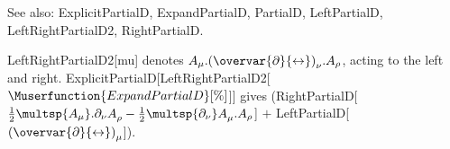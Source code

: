 See also: ExplicitPartialD, ExpandPartialD, PartialD, LeftPartialD, LeftRightPartialD2, RightPartialD.


\dispSFinmath{
\mu
}

\dispSFoutmath{
\mu
}

\dispSFinmath{
\mu
}


\dispSFinmath{
{{\left( \overvar{\partial }{\leftrightarrow } \right) }_{\mu }}
}










LeftRightPartialD2[mu] denotes \({A_{\mu }}.{{\left( \overvar{\partial }{\leftrightarrow } \right) }_{\nu }}.{A_{\rho }}\), acting to the left and
right. ExplicitPartialD[LeftRightPartialD2[\(\Muserfunction{ExpandPartialD}[\%]\)]] gives (RightPartialD[\(\frac{1}{2}\multsp {A_{\mu }}.{{\partial
}_{\nu }}A_{\rho }^{ }-\frac{1}{2}\multsp {{\partial }_{\nu }}A_{\mu }^{ }.{A_{\rho }}\)] \(+\) LeftPartialD[\({{\left( \overvar{\partial
}{\leftrightarrow } \right) }_{\mu }}\)]).

